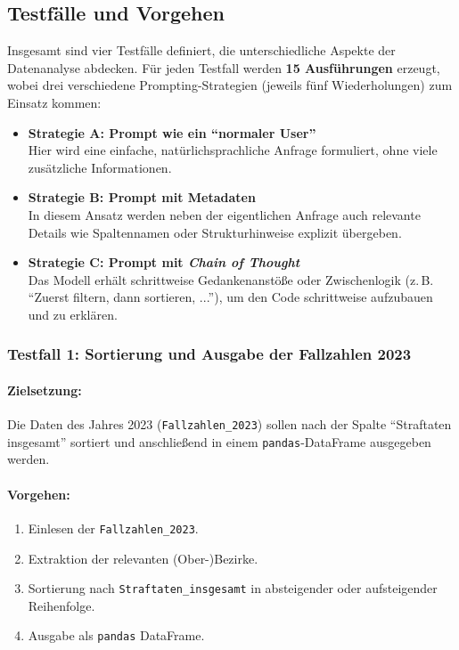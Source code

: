 \documentclass[11pt,a4paper]{article}
\begin{document}
\subsection{Testfälle und Vorgehen}
Insgesamt sind vier Testfälle definiert, die unterschiedliche Aspekte der Datenanalyse abdecken. Für jeden Testfall werden \textbf{15 Ausführungen} erzeugt, wobei drei verschiedene Prompting-Strategien (jeweils fünf Wiederholungen) zum Einsatz kommen:
\begin{itemize}
    \label{itemize:promptingstrategien}
    \item \textbf{Strategie A: Prompt wie ein \enquote{normaler User}}\\
    Hier wird eine einfache, natürlichsprachliche Anfrage formuliert, ohne viele zusätzliche Informationen.
    \item \textbf{Strategie B: Prompt mit Metadaten}\\
    In diesem Ansatz werden neben der eigentlichen Anfrage auch relevante Details wie Spaltennamen oder Strukturhinweise explizit übergeben.
    \item \textbf{Strategie C: Prompt mit \emph{Chain of Thought}}\\
    Das Modell erhält schrittweise Gedankenanstöße oder Zwischenlogik (z.\,B. \enquote{Zuerst filtern, dann sortieren, ...}), um den Code schrittweise aufzubauen und zu erklären.
\end{itemize}

\subsubsection{Testfall 1: Sortierung und Ausgabe der Fallzahlen 2023}
\label{subsec:tf1}
\paragraph{Zielsetzung:}
Die Daten des Jahres 2023 (\texttt{Fallzahlen\_2023}) sollen nach der Spalte \enquote{Straftaten insgesamt} sortiert und anschließend in einem \texttt{pandas}-DataFrame ausgegeben werden.

\paragraph{Vorgehen:}
\begin{enumerate}
    \item Einlesen der \texttt{Fallzahlen\_2023}.
    \item Extraktion der relevanten (Ober-)Bezirke.
    \item Sortierung nach \texttt{Straftaten\_insgesamt} in absteigender oder aufsteigender Reihenfolge.
    \item Ausgabe als \texttt{pandas} DataFrame.
\end{enumerate}
\end{document}
